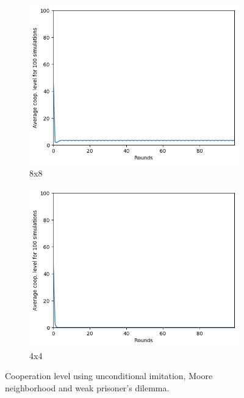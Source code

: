 \documentclass[letterpaper]{article}
\begin{document}
\begin{figure}[H]
\begin{subfigure}{.5\textwidth}
        \centering
        \includegraphics[width=1\linewidth]{images/assign2/8-part1}
        \caption{8x8}
        \label{fig:8moorepart1}
    \end{subfigure}
    \begin{subfigure}{.5\textwidth}
        \centering
        \includegraphics[width=1\linewidth]{images/assign2/4-part1}
        \caption{4x4}
        \label{fig:4moorepart1}
    \end{subfigure}
    \caption{Cooperation level using unconditional imitation, Moore neighborhood
    and weak prisoner's dilemma.}
    \label{fig:otherpart1}
\end{figure}
\end{document}
